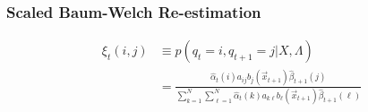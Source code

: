 \documentclass{beamer}
\begin{document}
\begin{frame}
  \frametitle{Scaled Baum-Welch Re-estimation}

  \begin{align*}
    \xi_t(i,j) &\equiv p(q_t=i,q_{t+1}=j|X,\Lambda)\\
    &= \frac{\hat\alpha_t(i)a_{ij}b_j(\vec{x}_{t+1})\hat\beta_{t+1}(j)}
       {\sum_{k=1}^N\sum_{\ell=1}^N \hat\alpha_t(k)a_{k\ell}b_\ell(\vec{x}_{t+1})\hat\beta_{t+1}(\ell)}
  \end{align*}
\end{frame}
\end{document}
